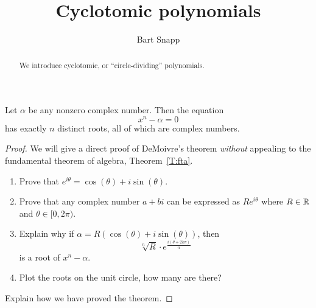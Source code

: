 \documentclass{ximera}
\author{Bart Snapp}
\title{Cyclotomic polynomials}
\begin{document}
\begin{abstract}
  We introduce cyclotomic, or ``circle-dividing'' polynomials.
\end{abstract}
\maketitle

\begin{theorem} 
Let $\alpha$ be any nonzero complex number. Then the equation
\[
x^n - \alpha = 0
\]
has exactly $n$ distinct roots, all of which are complex numbers.
\begin{proof} 
We will give a direct proof of DeMoivre's theorem \textit{without}
appealing to the fundamental theorem of algebra, Theorem~\ref{T:fta}.
\begin{enumerate}
\item Prove that $e^{i \theta} = \cos(\theta) + i \sin(\theta)$.
\item Prove that any complex number $a + bi$ can be expressed as $R
  e^{i\theta}$ where $R\in \mathbb R$ and $\theta \in [0,2\pi)$.
\item Explain why if $\alpha = R(\cos(\theta) +i \sin(\theta))$, then 
\[
\sqrt[n]{R} \cdot  e^{\frac{i(\theta + 2k\pi)}{n}}
\]
is a root of $x^n - \alpha$.
\item Plot the roots on the unit circle, how many are there?
\end{enumerate}
Explain how we have proved the theorem.
\end{proof}
\end{theorem}
\end{document}
